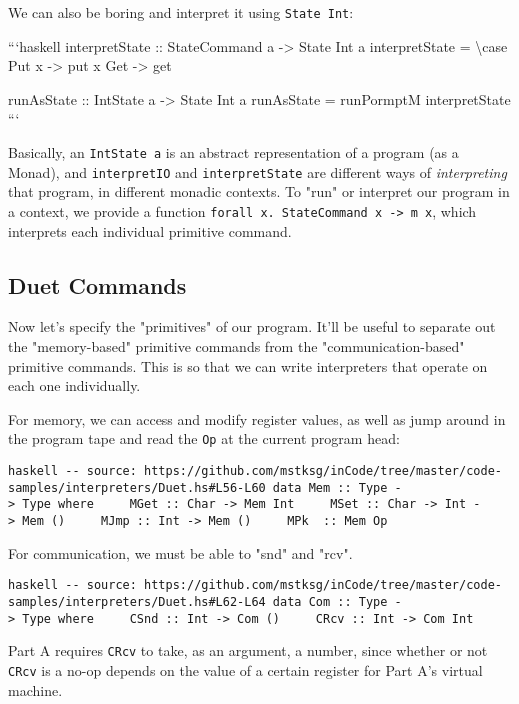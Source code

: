 \documentclass[]{article}
\begin{document}
We can also be boring and interpret it using \texttt{State\ Int}:

```haskell interpretState :: StateCommand a -\textgreater{} State Int a
interpretState = \textbackslash{}case Put x -\textgreater{} put x Get
-\textgreater{} get

runAsState :: IntState a -\textgreater{} State Int a runAsState = runPormptM
interpretState ```

Basically, an \texttt{IntState\ a} is an abstract representation of a program
(as a Monad), and \texttt{interpretIO} and \texttt{interpretState} are different
ways of \emph{interpreting} that program, in different monadic contexts. To
"run" or interpret our program in a context, we provide a function
\texttt{forall\ x.\ StateCommand\ x\ -\textgreater{}\ m\ x}, which interprets
each individual primitive command.

\subsection{Duet Commands}

Now let's specify the "primitives" of our program. It'll be useful to separate
out the "memory-based" primitive commands from the "communication-based"
primitive commands. This is so that we can write interpreters that operate on
each one individually.

For memory, we can access and modify register values, as well as jump around in
the program tape and read the \texttt{Op} at the current program head:

\texttt{haskell\ -\/-\ source:\ https://github.com/mstksg/inCode/tree/master/code-samples/interpreters/Duet.hs\#L56-L60\ data\ Mem\ ::\ Type\ -\textgreater{}\ Type\ where\ \ \ \ \ MGet\ ::\ Char\ -\textgreater{}\ Mem\ Int\ \ \ \ \ MSet\ ::\ Char\ -\textgreater{}\ Int\ -\textgreater{}\ Mem\ ()\ \ \ \ \ MJmp\ ::\ Int\ -\textgreater{}\ Mem\ ()\ \ \ \ \ MPk\ \ ::\ Mem\ Op}

For communication, we must be able to "snd" and "rcv".

\texttt{haskell\ -\/-\ source:\ https://github.com/mstksg/inCode/tree/master/code-samples/interpreters/Duet.hs\#L62-L64\ data\ Com\ ::\ Type\ -\textgreater{}\ Type\ where\ \ \ \ \ CSnd\ ::\ Int\ -\textgreater{}\ Com\ ()\ \ \ \ \ CRcv\ ::\ Int\ -\textgreater{}\ Com\ Int}

Part A requires \texttt{CRcv} to take, as an argument, a number, since whether
or not \texttt{CRcv} is a no-op depends on the value of a certain register for
Part A's virtual machine.
\end{document}
